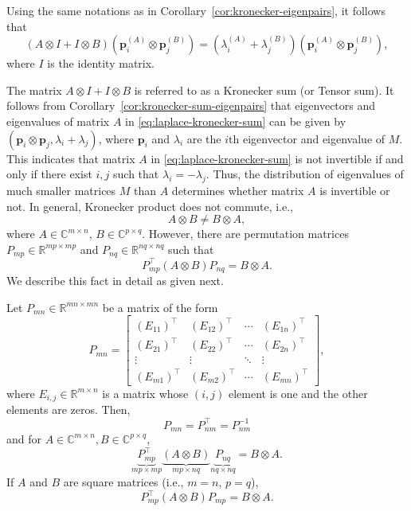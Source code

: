 \begin{Corollary}\label{cor:kronecker-sum-eigenpairs}
{Using the same notations as in Corollary\ \ref{cor:kronecker-eigenpairs}, it follows that}
\[(A\otimes I+I\otimes B)\left(\boldsymbol{p}_i^{(A)}\otimes\boldsymbol{p}_j^{(B)}\right)=\left(\lambda_i^{(A)}+\lambda_j^{(B)}\right)\left(\boldsymbol{p}_i^{(A)}\otimes\boldsymbol{p}_j^{(B)}\right),\]
{where $I$ is the identity matrix.}
\end{Corollary}
{The matrix $A\otimes I+I\otimes B$ is referred to as a Kronecker sum (or Tensor sum). It follows from Corollary\ \ref{cor:kronecker-sum-eigenpairs} that eigenvectors and eigenvalues of matrix $A$ in \eqref{eq:laplace-kronecker-sum} can be given by $(\boldsymbol{p}_i\otimes\boldsymbol{p}_j,\lambda_i+\lambda_j)$, where $\boldsymbol{p}_i$ and $\lambda_i$ are the $i$th eigenvector and eigenvalue of $M$. This indicates that matrix $A$ in \eqref{eq:laplace-kronecker-sum} is not invertible if and only if there exist $i,j$ such that $\lambda_i=-\lambda_j$. Thus, the distribution of eigenvalues of much smaller matrices $M$ than $A$ determines whether matrix $A$ is invertible or not.}
{In general, Kronecker product does not commute, i.e.,}
\[A\otimes B\ne B\otimes A,\]
{where $A\in\mathbb{C}^{m\times n}$, $B\in\mathbb{C}^{p\times q}$. However, there are permutation matrices $P_{mp}\in\mathbb{R}^{mp\times mp}$ and $P_{nq}\in\mathbb{R}^{nq\times nq}$ such that}
\[P_{mp}^{\top}(A\otimes B)P_{nq}=B\otimes A.\]
{We describe this fact in detail as given next.}
\begin{Theorem}\label{thm:kronecker-permutation}
{Let $P_{mn}\in\mathbb{R}^{mn\times mn}$ be a matrix of the form}
\begin{equation}\label{eq:kronecker-commutation-matrix}
P_{mn}=\begin{bmatrix}
(E_{11})^{\top}&(E_{12})^{\top}&\cdots&(E_{1n})^{\top}\\
(E_{21})^{\top}&(E_{22})^{\top}&\cdots&(E_{2n})^{\top}\\
\vdots&\vdots&\ddots&\vdots\\
(E_{m1})^{\top}&(E_{m2})^{\top}&\cdots&(E_{mn})^{\top}
\end{bmatrix},
\end{equation}
{where $E_{i,j}\in\mathbb{R}^{m\times n}$ is a matrix whose $(i,j)$ element is one and the other elements are zeros. Then,}
\[P_{mn}=P_{nm}^{\top}=P_{nm}^{-1}\]
{and for $A\in\mathbb{C}^{m\times n},B\in\mathbb{C}^{p\times q}$,}
\begin{equation}\label{eq:kronecker-swapping-permutation}
\underbrace{P_{mp}^{\top}}_{mp\times mp}\underbrace{(A\otimes B)}_{mp\times nq}\underbrace{P_{nq}}_{nq\times nq}=B\otimes A.
\end{equation}
{If $A$ and $B$ are square matrices (i.e., $m=n$, $p=q$),}
\[P_{mp}^{\top}(A\otimes B)P_{mp}=B\otimes A.\]
\end{Theorem}
